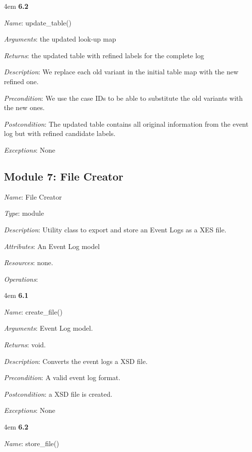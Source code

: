 \documentclass[notitlepage]{article}
\begin{document}
\begin{flushleft}
\medskip

\par
\begingroup
\leftskip4em
\textbf{6.2} 

\textit{Name}: update\_table()

\textit{Arguments}: the updated look-up map

\textit{Returns}: the updated table with refined labels for the complete log

\textit{Description}: We replace each old variant in the initial table map with the new refined one.

\textit{Precondition}: We use the case IDs to be able to substitute the old variants with the new ones.

\textit{Postcondition}: The updated table contains all original information from the event log but with refined candidate labels.

\textit{Exceptions}: None
\par
\endgroup




\subsection{Module 7: File Creator}
\textit{Name}: File Creator

\textit{Type}: module

\textit{Description}: Utility class to export and store an Event Logs as a XES file.

\textit{Attributes}: An Event Log model

\textit{Resources}: none.

\textit{Operations}: 
\medskip
\par
\begingroup
\leftskip4em
\textbf{6.1} 

\textit{Name}: create\_file()

\textit{Arguments}: Event Log model.

\textit{Returns}: void.

\textit{Description}: Converts the event logs a XSD file.

\textit{Precondition}: A valid event log format.

\textit{Postcondition}: a XSD file is created.

\textit{Exceptions}: None
\par
\endgroup

\medskip
\par
\begingroup
\leftskip4em
\textbf{6.2} 

\textit{Name}: store\_file()


\end{flushleft}
\end{document}
